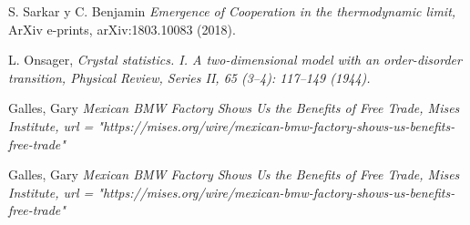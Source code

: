 \documentclass[letterpaper,12pt,oneside]{book}
\begin{document}
 \begin{thebibliography}{99}




  S. Sarkar y C. Benjamin {\it Emergence of Cooperation in the thermodynamic limit,} ArXiv e-prints, arXiv:1803.10083 (2018).

 L. Onsager, \it{Crystal statistics. I. A two-dimensional model with an order-disorder transition}, Physical Review, Series II, 65 (3–4): 117–149 (1944).

 Galles, Gary \it{Mexican BMW Factory Shows Us the Benefits of Free Trade, } Mises Institute, url  = "https://mises.org/wire/mexican-bmw-factory-shows-us-benefits-free-trade"

 Galles, Gary \it{Mexican BMW Factory Shows Us the Benefits of Free Trade, } Mises Institute, url  = "https://mises.org/wire/mexican-bmw-factory-shows-us-benefits-free-trade"

\end{thebibliography}




  
\end{document}
